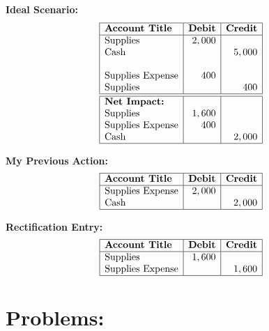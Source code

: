 \documentclass[12pt,a4paper]{book}
\begin{document}
\textbf{Ideal Scenario:}
\[
\begin{array}{|l|r|r|}
\hline
\textbf{Account Title} & \textbf{Debit} & \textbf{Credit} \\
\hline
\text{Supplies} & 2,000 & \\
\text{Cash} & & 5,000 \\
& & \\
\text{Supplies Expense} & 400 & \\
\text{Supplies} & & 400 \\
\hline \hline 
\textbf{Net Impact:} & & \\
\text{Supplies} & 1,600 & \\
\text{Supplies Expense} & 400 & \\
\text{Cash} & & 2,000 \\
\hline 
\end{array}
\]

\begin{multicols}{2}
\textbf{My Previous Action:}
\[
\begin{array}{|l|r|r|}
\hline
\textbf{Account Title} & \textbf{Debit} & \textbf{Credit} \\
\hline
\text{Supplies Expense} & 2,000 & \\
\text{Cash} & & 2,000 \\
\hline
\end{array}
\]

\textbf{Rectification Entry:}
\[
\begin{array}{|l|r|r|}
\hline
\textbf{Account Title} & \textbf{Debit} & \textbf{Credit} \\
\hline
\text{Supplies} & 1,600 & \\
\text{Supplies Expense} & & 1,600 \\
\hline
\end{array}
\]

\end{multicols}
\vspace{0.5cm}

\clearpage

\section*{Problems:} 
\end{document}
